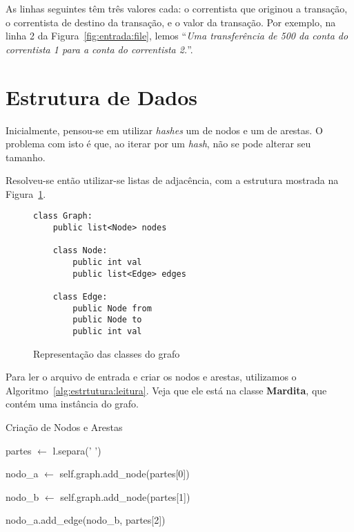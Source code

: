 \documentclass[12pt]{article}
\begin{document}
As linhas seguintes têm três valores cada: o correntista que originou a
transação, o correntista de destino da transação, e o valor da transação. Por
exemplo, na linha 2 da Figura~\ref{fig:entrada:file}, lemos ``\textit{Uma
  transferência de 500 da conta do correntista 1 para a conta do correntista 2.}''.

\section{Estrutura de Dados}\label{sec:estrutura}

Inicialmente, pensou-se em utilizar \textit{hashes} um de nodos e um de arestas.
O problema com isto é que, ao iterar por um \textit{hash}, não se pode alterar
seu tamanho.

Resolveu-se então utilizar-se listas de adjacência, com a estrutura mostrada na
Figura~\ref{fig:estrutura:classes}.

\begin{figure}[htb!]
    \begin{lstlisting}
class Graph:
    public list<Node> nodes

    class Node:
        public int val
        public list<Edge> edges

    class Edge:
        public Node from
        public Node to
        public int val
    \end{lstlisting}
  \caption{Representação das classes do grafo}
\label{fig:estrutura:classes}
\end{figure}

Para ler o arquivo de entrada e criar os nodos e arestas, utilizamos o
Algoritmo~\ref{alg:estrtutura:leitura}. Veja que ele está na classe
\textsf{\textbf{Mardita}}, que contém uma instância do grafo.

\begin{algorithm}[H]
 \caption{Criação de Nodos e Arestas}
 \label{alg:estrutura:leitura}
    {
        partes $\gets$ l.separa(' ') 

        nodo\_a $\gets$ self.graph.add\_node(partes[0])

        nodo\_b $\gets$ self.graph.add\_node(partes[1])

        nodo\_a.add\_edge(nodo\_b, partes[2]) 
    }
\end{algorithm}
\end{document}
